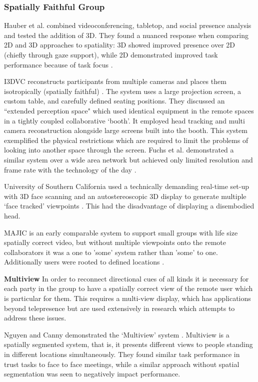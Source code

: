            \subsubsection{Spatially Faithful Group}
                Hauber et al. combined videoconferencing, tabletop, and social presence analysis and tested the addition of 3D. They found a nuanced response when comparing 2D and 3D approaches to spatiality: 3D showed improved presence over 2D (chiefly through gaze support), while 2D demonstrated improved task performance because of task focus \cite{Hauber2006}.\par
                I3DVC reconstructs participants from multiple cameras and places them isotropically (spatially faithful) \cite{Kauff2002, Kauff2002a}. The system uses a large projection screen, a custom table, and carefully defined seating positions. They discussed an ``extended perception space" which used identical equipment in the remote spaces in a tightly coupled collaborative `booth'. It employed head tracking and multi camera reconstruction alongside large screens built into the booth. This system exemplified the physical restrictions which are required to limit the problems of looking into another space through the screen. Fuchs et al. demonstrated a similar system over a wide area network but achieved only limited resolution and frame rate with the technology of the day \cite{Fuchs:2002ww}. \par University of Southern California used a technically demanding real-time set-up with 3D face scanning and an autostereoscopic 3D display to generate multiple `face tracked' viewpoints \cite{jones2009headspin}. This had the disadvantage of displaying a disembodied head.\par                
MAJIC is an early comparable system to support small groups with life size spatially correct video, but without multiple viewpoints onto the remote collaborators it was a one to 'some' system rather than 'some' to one. Additionally users were rooted to defined locations \cite{Ichikawa1995, Okada:1994et}.\par


\textbf{Multiview}
In order to reconnect directional cues of all kinds it is necessary for each party in the group to have a spatially correct view of the remote user which is particular for them. This requires a multi-view display, which has applications beyond telepresence but are used extensively in research which attempts to address these issues.\par
Nguyen and Canny demonstrated the `Multiview' system \cite{Nguyen2005}. Multiview is a spatially segmented system, that is, it presents different views to people standing in different locations simultaneously. They found similar task performance in trust tasks to face to face meetings, while a similar approach without spatial segmentation was seen to negatively impact performance.\par
                    
